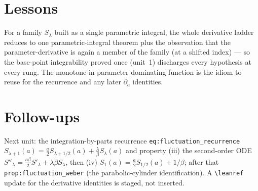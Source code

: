 \documentclass[11pt]{article}
\begin{document}
\section{Lessons}
For a family $S_\lambda$ built as a single parametric integral, the whole derivative ladder reduces
to one parametric-integral theorem plus the observation that the parameter-derivative is again a
member of the family (at a shifted index) --- so the base-point integrability proved once (unit~1)
discharges every hypothesis at every rung. The monotone-in-parameter dominating function is the
idiom to reuse for the recurrence and any later $\partial_a$ identities.

\section{Follow-ups}
Next unit: the integration-by-parts recurrence \texttt{eq:fluctuation\_recurrence}
$S_{\lambda+1}(a)=\tfrac{a}{2}S_{\lambda+1/2}(a)+\tfrac{\lambda}{\beta}S_\lambda(a)$ and property
(iii) the second-order ODE $S''_\lambda=\tfrac{a\beta}{2}S'_\lambda+\lambda\beta S_\lambda$, then
(iv) $S_1(a)=\tfrac{a}{2}S_{1/2}(a)+1/\beta$; after that \texttt{prop:fluctuation\_weber} (the
parabolic-cylinder identification). A \texttt{\textbackslash leanref} update for the derivative
identities is staged, not inserted.
\end{document}
